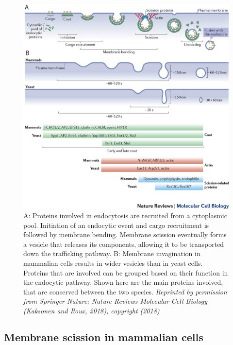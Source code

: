 \begin{figure}[H]
	\centering
	\hspace{-2mm}
	\includegraphics[scale=0.8]{figures/intro/Fig2_kaksonen}
\caption[Endocytic pathway in mammalian and yeast cells]
{A: Proteins involved in endocytosis are recruited from a cytoplasmic pool. Initiation of an endocytic event and cargo recruitment is followed by membrane bending. Membrane scission eventually forms a vesicle that releases its components, allowing it to be transported down the trafficking pathway. B: Membrane invagination in mammalian cells results in wider vesicles than in yeast cells. Proteins that are involved can be grouped based on their function in the endocytic pathway. Shown here are the main proteins involved, that are conserved between the two species. 
	\textit{Reprinted by permission from Springer Nature: Nature Reviews Molecular Cell Biology (Kaksonen and Roux, 2018), copyright (2018)}
\label{intro_endpathway}}
\end{figure}
		
		\newpage
\subsection{Membrane scission in mammalian cells}
